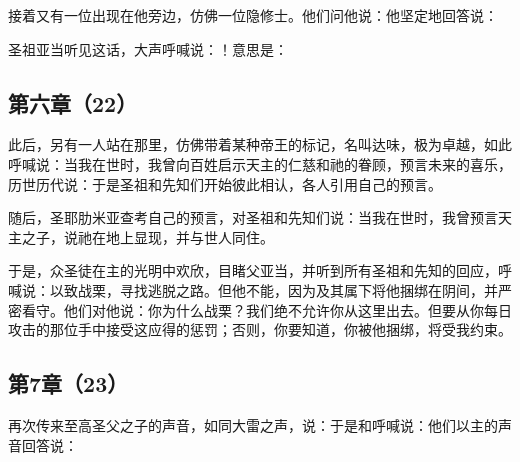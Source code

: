 接着又有一位出现在他旁边，仿佛一位隐修士。他们问他说：他坚定地回答说：\par

圣祖亚当听见这话，大声呼喊说：！意思是：\par


\subsection{第六章（22）}

此后，另有一人站在那里，仿佛带着某种帝王的标记，名叫达味，极为卓越，如此呼喊说：当我在世时，我曾向百姓启示天主的仁慈和祂的眷顾，预言未来的喜乐，历世历代说：于是圣祖和先知们开始彼此相认，各人引用自己的预言。\par

随后，圣耶肋米亚查考自己的预言，对圣祖和先知们说：当我在世时，我曾预言天主之子，说祂在地上显现，并与世人同住。\par

于是，众圣徒在主的光明中欢欣，目睹父亚当，并听到所有圣祖和先知的回应，呼喊说：以致战栗，寻找逃脱之路。但他不能，因为及其属下将他捆绑在阴间，并严密看守。他们对他说：你为什么战栗？我们绝不允许你从这里出去。但要从你每日攻击的那位手中接受这应得的惩罚；否则，你要知道，你被他捆绑，将受我约束。\par


\subsection{第7章（23）}

再次传来至高圣父之子的声音，如同大雷之声，说：于是和呼喊说：他们以主的声音回答说：\par

